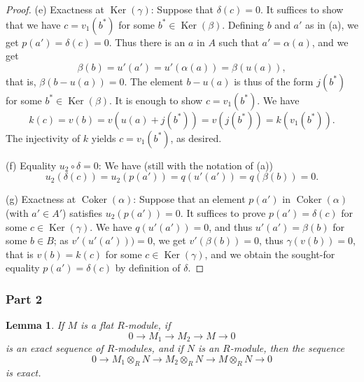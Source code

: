 \documentclass[parskip=half,fontsize=12pt]{scrartcl}%
\newcommand{\oo}{\operatorname}\newcommand{\ooo}{\operatorname*}
\newtheorem{lem}[thm]{Lemma}
\begin{document}
\begin{proof}
(e) Exactness at $\oo{Ker}(\gamma)$: Suppose that $\delta(c)=0$. It suffices to show that we have $c=v_1(b^*)$ for some $b^*\in\oo{Ker}(\beta)$. Defining $b$ and $a'$ as in (a), we get $p(a')=\delta(c)=0$. Thus there is an $a$ in $A$ such that $a'=\alpha(a)$, %
and we get 
$$
\beta(b)=u'(a')= u'(\alpha(a))= \beta(u(a)),
$$ 
that is, $\beta(b-u(a))=0$. The element $b-u(a)$ is thus of the form $j(b^*)$ for some $b^*\in\oo{Ker}(\beta)$. It is enough to show $c=v_1(b^*)$. We have 
$$
k(c)=v(b)= v(u(a)+j(b^*))=v(j(b^*))=k(v_1(b^*)).
$$ 
The injectivity of $k$ yields $c=v_1(b^*)$, as desired.

(f) Equality $u_2\circ\delta=0$: We have (still with the notation of (a)) 
$$
u_2(\delta(c))=u_2(p(a'))=q(u'(a'))=q(\beta(b))=0.
$$ 

(g) Exactness at $\oo{Coker}(\alpha)$: Suppose that an element $p(a')$ in $\oo{Coker}(\alpha)$ (with $a'\in A'$) satisfies $u_2(p(a'))=0$. It suffices to prove $p(a')=\delta(c)$ for some $c\in\oo{Ker}(\gamma)$. We have $q(u'(a'))=0$, and thus $u'(a')=\beta(b)$ for some $b\in B$; as $v'(u'(a')))=0$, we get $v'(\beta(b))=0$, thus $\gamma(v(b))=0$, that is $v(b)=k(c)$ for some $c\in\oo{Ker}(\gamma)$, and we obtain the sought-for equality $p(a')=\delta(c)$ by definition of $\delta$.%
\end{proof}

\subsubsection{Part 2}

\begin{lem}\label{b254}
If $M$ is a flat $R$-module, if 
$$
0\to M_1\to M_2\to M\to0
$$ 
is an exact sequence of $R$-modules, and if $N$ is an $R$-module, then the sequence 
$$
0\to M_1\otimes_RN\to M_2\otimes_RN\to M\otimes_RN\to0
$$ 
is exact.
\end{lem}
\end{document}
